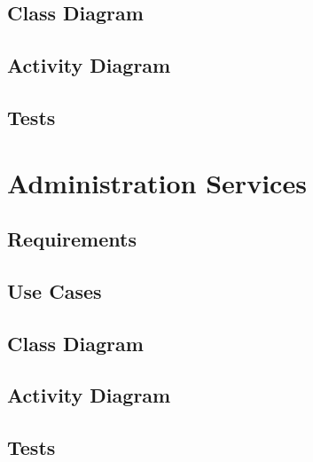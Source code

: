 \subsection{Class Diagram}
\label{sec:user-class-diagram}


\subsection{Activity Diagram}
\label{sec:user-activity-diagram}

\subsection{Tests}
\label{sec:user-tests}





\section{Administration Services}
\label{sec:admin-use-cases}
\subsection{Requirements}
\label{sec:user-requirements}

\subsection{Use Cases}
\label{sec:admin-use-cases}

\subsection{Class Diagram}
\label{sec:admin-class-diagram}


\subsection{Activity Diagram}
\label{sec:admin-activity-diagram}

\subsection{Tests}
\label{sec:admin-tests}


